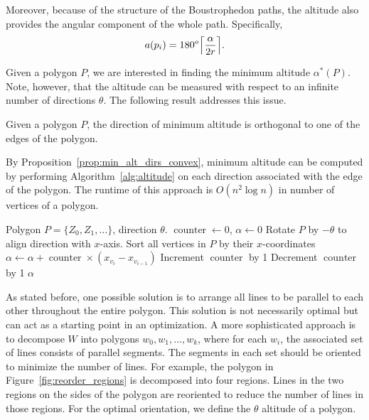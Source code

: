 \documentclass[../main.tex]{subfiles}
\begin{document}
Moreover, because of the structure of the Boustrophedon paths, the altitude also provides the angular component of the whole path. Specifically, 
\begin{equation}
	a(p_i)=180^o\ceil*{\frac{\alpha}{2r}}.
\end{equation}

Given a polygon $P$, we are interested in finding the minimum altitude $\alpha^*(P)$.  Note, however, that the altitude can be measured with respect to an infinite number of directions $\theta$. The following result addresses this issue.
\begin{proposition}
\label{prop:min_alt_dirs_convex}
Given a polygon $P$, the direction of minimum altitude is orthogonal to one of the edges of the polygon. 
\end{proposition}
By Proposition~\ref{prop:min_alt_dirs_convex}, minimum altitude can be computed by performing Algorithm~\ref{alg:altitude} on each direction associated with the edge of the polygon. The runtime of this approach is $O(n^2\log n)$ in number of vertices of a polygon.

\begin{algorithm}
	\caption{$\operatorname{get\_general\_altitude}(P, \theta)$}
	\label{alg:altitude}
	\begin{algorithmic}[1]
		\REQUIRE Polygon $P=\{Z_0, Z_1,\ldots\}$, direction $\theta$.
			\STATE $\operatorname{counter}\gets 0$, $\alpha\gets 0$
			\STATE Rotate $P$ by $-\theta$ to align direction with $x$-axis.
			\STATE Sort all vertices in $P$ by their  $x$-coordinates
				\STATE $\alpha\gets \alpha+\operatorname{counter}\times(x_{v_{i}}-x_{v_{i-1}})$ 
					\STATE Increment $\operatorname{counter}$ by 1
					\STATE Decrement $\operatorname{counter}$ by 1
				\ENDIF
			\ENDFOR
			\RETURN $\alpha$
	\end{algorithmic}
\end{algorithm}


As stated before, one possible solution is to arrange all lines to be parallel to each other throughout the entire polygon. This solution is not necessarily optimal but can act as a starting point in an optimization. A more sophisticated approach is to decompose $W$ into polygons $w_0,w_1,\ldots,w_k$, where for each $w_i$, the associated set of lines consists of parallel segments. The segments in each set should be oriented to minimize the number of lines. For example, the polygon in Figure~\ref{fig:reorder_regions} is decomposed into four regions. Lines in the two regions on the sides of the polygon are reoriented to reduce the number of lines in those regions. For the optimal orientation, we define the $\theta$ altitude of a polygon.
\end{document}
